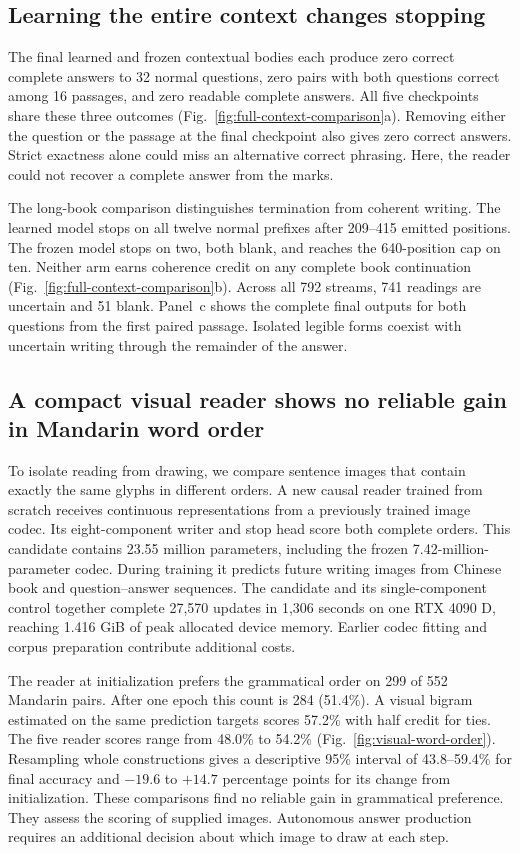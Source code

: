 \documentclass[12pt,a4paper]{article}
\providecommand{\DIFadd}[1]{{\protect\color{blue} \sf #1}} %
\begin{document}
\subsection*{\DIFadd{Learning the entire context changes stopping}}
\DIFadd{The final learned and frozen contextual bodies each produce zero correct
complete answers to 32 normal questions, zero pairs with both questions correct
among 16 passages, and zero readable complete answers. All five checkpoints
share these three outcomes (Fig.~\ref{fig:full-context-comparison}a).
Removing either the question or the passage at the final checkpoint also gives
zero correct answers. Strict exactness alone could miss an alternative correct
phrasing. Here, the reader could not recover a complete answer from the marks.
}

\DIFadd{The long-book comparison distinguishes termination from coherent writing.
The learned model stops on all twelve normal prefixes after 209--415 emitted
positions. The frozen model stops on two, both blank, and reaches the 640-position
cap on ten. Neither arm earns coherence credit on any complete book continuation
(Fig.~\ref{fig:full-context-comparison}b). Across all 792 streams, 741 readings
are uncertain and 51 blank. Panel~c shows the complete final outputs for both
questions from the first paired passage. Isolated legible forms coexist with
uncertain writing through the remainder of the answer.
}

\subsection*{\DIFadd{A compact visual reader shows no reliable gain in Mandarin word order}}
\DIFadd{To isolate reading from drawing, we compare sentence images that contain
exactly the same glyphs in different orders. A new causal reader trained from
scratch receives continuous representations from a previously trained image
codec. Its eight-component writer and stop head score both complete orders.
This candidate contains 23.55 million parameters, including the frozen
7.42-million-parameter codec. During training it predicts future writing images
from Chinese book and question--answer sequences. The candidate and its
single-component control together complete 27,570 updates in 1,306 seconds on
one RTX 4090 D, reaching 1.416 GiB of peak allocated device memory. Earlier
codec fitting and corpus preparation contribute additional costs.
}

\DIFadd{The reader at initialization prefers the grammatical order on 299 of 552
Mandarin pairs. After one epoch this count is 284 (51.4\%).
A visual bigram estimated on the same prediction targets scores 57.2\% with
half credit for ties. The five reader scores range from 48.0\% to 54.2\%
(Fig.~\ref{fig:visual-word-order}). Resampling whole constructions gives a
descriptive 95\% interval of 43.8--59.4\% for final accuracy and
$-19.6$ to $+14.7$ percentage points for its change from initialization.
These comparisons find no reliable gain in grammatical preference. They
assess the scoring of supplied images. Autonomous answer production requires
an additional decision about which image to draw at each step.
}
\end{document}

